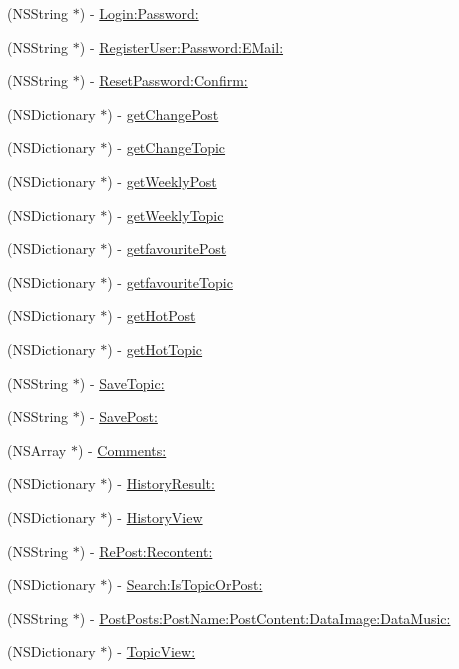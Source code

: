\begin{DoxyCompactItemize}
\item 
(NSString $\ast$) -\/ \hyperlink{interface_post_bar___model_a329a6758853df2b579d0c79a939dd425}{Login:Password:}
\item 
(NSString $\ast$) -\/ \hyperlink{interface_post_bar___model_aa00b46124313dd5ad41076bf42e5504d}{RegisterUser:Password:EMail:}
\item 
(NSString $\ast$) -\/ \hyperlink{interface_post_bar___model_a893780f461faa84630c20c7caee282bb}{ResetPassword:Confirm:}
\item 
(NSDictionary $\ast$) -\/ \hyperlink{interface_post_bar___model_a0e719fa721d0cecc9939eacf981c7c29}{getChangePost}
\item 
(NSDictionary $\ast$) -\/ \hyperlink{interface_post_bar___model_adbb2f191eaed5800fef3c36b10d66e49}{getChangeTopic}
\item 
(NSDictionary $\ast$) -\/ \hyperlink{interface_post_bar___model_a563e81be455ea14888ee4f93173d9581}{getWeeklyPost}
\item 
(NSDictionary $\ast$) -\/ \hyperlink{interface_post_bar___model_a6fefc66cbf95c8a90127bbded955135c}{getWeeklyTopic}
\item 
(NSDictionary $\ast$) -\/ \hyperlink{interface_post_bar___model_a3a540f926f014ee30ccdd798b9611ee2}{getfavouritePost}
\item 
(NSDictionary $\ast$) -\/ \hyperlink{interface_post_bar___model_afe2a2b43c57440e3981ee3850a6ec75b}{getfavouriteTopic}
\item 
(NSDictionary $\ast$) -\/ \hyperlink{interface_post_bar___model_aa4abe46ee0d351c2b949420a8c77dc97}{getHotPost}
\item 
(NSDictionary $\ast$) -\/ \hyperlink{interface_post_bar___model_a023143cb187810faa82b40fd8d8d72e4}{getHotTopic}
\item 
(NSString $\ast$) -\/ \hyperlink{interface_post_bar___model_a2c21280cadb8cb15ae02a8926fbadc89}{SaveTopic:}
\item 
(NSString $\ast$) -\/ \hyperlink{interface_post_bar___model_aaecc815d441eef9dc0e9885bea9bcc1c}{SavePost:}
\item 
(NSArray $\ast$) -\/ \hyperlink{interface_post_bar___model_a4632315044ab3e611ab9227f3bda8649}{Comments:}
\item 
(NSDictionary $\ast$) -\/ \hyperlink{interface_post_bar___model_ae259a6984254b80e353b42a072e9cda3}{HistoryResult:}
\item 
(NSDictionary $\ast$) -\/ \hyperlink{interface_post_bar___model_a48da10db74c5e6db47ce7e06809f2ca6}{HistoryView}
\item 
(NSString $\ast$) -\/ \hyperlink{interface_post_bar___model_ad6d71753ce1178fbfc042e348cd78151}{RePost:Recontent:}
\item 
(NSDictionary $\ast$) -\/ \hyperlink{interface_post_bar___model_a0cad0cceb244b44a5892953b73f88301}{Search:IsTopicOrPost:}
\item 
(NSString $\ast$) -\/ \hyperlink{interface_post_bar___model_a6f94e21445f26f555d00a2a0170392cf}{PostPosts:PostName:PostContent:DataImage:DataMusic:}
\item 
(NSDictionary $\ast$) -\/ \hyperlink{interface_post_bar___model_a2bbb27d0369f1600fb1a429bd61d6530}{TopicView:}
\end{DoxyCompactItemize}
